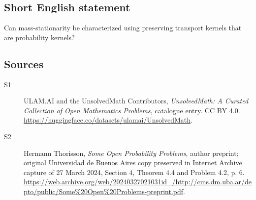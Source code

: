 \documentclass[11pt]{article}
\begin{document}
\subsection{Short English statement}
Can mass-stationarity be characterized using preserving transport kernels that are probability kernels?
\subsection{Sources}
\begin{description}
\item[\hypertarget{source:statement:1}{S1}] ULAM.AI and the UnsolvedMath Contributors, \emph{UnsolvedMath: A Curated Collection of Open Mathematics Problems}, catalogue entry. CC BY 4.0. \url{https://huggingface.co/datasets/ulamai/UnsolvedMath}.
\item[\hypertarget{source:statement:2}{S2}] Hermann Thorisson, \emph{Some Open Probability Problems}, author preprint; original Universidad de Buenos Aires copy preserved in Internet Archive capture of 27 March 2024, Section 4, Theorem 4.4 and Problem 4.2, p. 6. \url{https://web.archive.org/web/20240327021031id_/http://cms.dm.uba.ar/depto/public/Some%20Open%20Problems-preprint.pdf}.
\end{description}
\label{end:statement}
\end{document}
